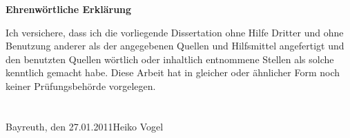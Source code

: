 \documentclass[11pt]{article}
\begin{document}
\centerline{\large \bf Ehrenwörtliche Erklärung}
\vspace{5mm}
Ich versichere, dass ich die vorliegende Dissertation ohne Hilfe Dritter und ohne Benutzung anderer als der angegebenen Quellen und Hilfsmittel angefertigt und den benutzten Quellen wörtlich oder inhaltlich entnommene Stellen als solche kenntlich gemacht habe. Diese Arbeit hat in gleicher oder ähnlicher Form noch keiner Prüfungsbehörde vorgelegen.
\\
\\
\\
Bayreuth, den 27.01.2011\hfill Heiko Vogel
\end{document}
